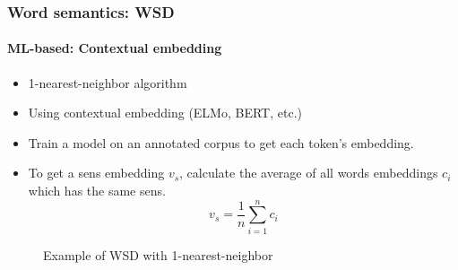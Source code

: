 \documentclass[xcolor=table]{beamer}
\begin{document}
\begin{frame}
\frametitle{Word semantics: WSD}
\framesubtitle{ML-based: Contextual embedding}

\begin{minipage}{.68\textwidth}
\begin{itemize}
	\item 1-nearest-neighbor algorithm
	\item Using contextual embedding (ELMo, BERT, etc.)
	\item Train a model on an annotated corpus to get each token's embedding.
	\item To get a sens embedding $v_s$, calculate the average of all words embeddings $c_i$ which has the same sens.
	\[ v_s = \frac{1}{n} \sum_{i=1}^{n} c_i \] 
\end{itemize}
\end{minipage}
\begin{minipage}{.3\textwidth}
	\begin{figure}
		\caption{Example of WSD with 1-nearest-neighbor \cite{2019-jurafsky-martin}}
	\end{figure}
\end{minipage}

\end{frame}

\end{document}
